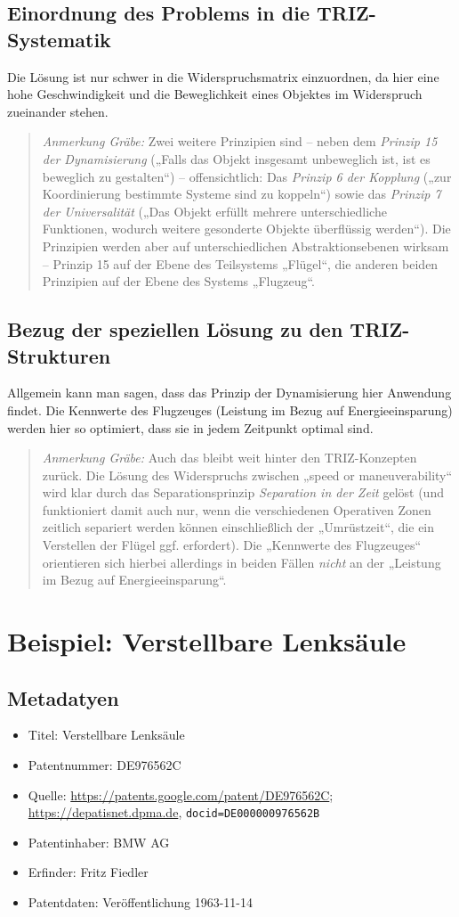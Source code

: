 \documentclass[11pt,a4paper]{article}
\newcommand{\HGG}[1]{\begin{quote} \emph{Anmerkung Gräbe:} #1  \end{quote}}
\begin{document}
\subsection{Einordnung des Problems in die TRIZ-Systematik}
Die Lösung ist nur schwer in die Widerspruchsmatrix einzuordnen, da hier eine
hohe Geschwindigkeit und die Beweglichkeit eines Objektes im Widerspruch
zueinander stehen.

\HGG{Zwei weitere Prinzipien sind -- neben dem \emph{Prinzip 15 der
    Dynamisierung} („Falls das Objekt insgesamt unbeweglich ist, ist es
  beweglich zu gestalten“) -- offensichtlich: Das \emph{Prinzip 6 der
    Kopplung} („zur Koordinierung bestimmte Systeme sind zu koppeln“) sowie
  das \emph{Prinzip 7 der Universalität} („Das Objekt erfüllt mehrere
  unterschiedliche Funktionen, wodurch weitere gesonderte Objekte überflüssig
  werden“).  Die Prinzipien werden aber auf unterschiedlichen
  Abstraktionsebenen wirksam -- Prinzip 15 auf der Ebene des Teilsystems
  „Flügel“, die anderen beiden Prinzipien auf der Ebene des Systems
  „Flugzeug“.  }

\subsection{Bezug der speziellen Lösung zu den TRIZ-Strukturen}
Allgemein kann man sagen, dass das Prinzip der Dynamisierung hier Anwendung
findet. Die Kennwerte des Flugzeuges (Leistung im Bezug auf Energieeinsparung)
werden hier so optimiert, dass sie in jedem Zeitpunkt optimal sind.

\HGG{Auch das bleibt weit hinter den TRIZ-Konzepten zurück. Die Lösung des
  Widerspruchs zwischen „speed or maneuverability“ wird klar durch das
  Separationsprinzip \emph{Separation in der Zeit} gelöst (und funktioniert
  damit auch nur, wenn die verschiedenen Operativen Zonen zeitlich separiert
  werden können einschließlich der „Umrüstzeit“, die ein Verstellen der Flügel
  ggf. erfordert).  Die „Kennwerte des Flugzeuges“ orientieren sich hierbei
  allerdings in beiden Fällen \emph{nicht} an der „Leistung im Bezug auf
  Energieeinsparung“. }


\section{Beispiel: Verstellbare Lenksäule}
\subsection{Metadatyen}
\begin{itemize}\itemsep0pt
\item Titel: Verstellbare Lenksäule
\item Patentnummer: DE976562C
\item Quelle: \url{https://patents.google.com/patent/DE976562C}; \\
  \url{https://depatisnet.dpma.de}, \texttt{docid=DE000000976562B} 
\item Patentinhaber: BMW AG 
\item Erfinder: Fritz Fiedler 
\item Patentdaten: Veröffentlichung 1963-11-14
\end{itemize}
\end{document}
